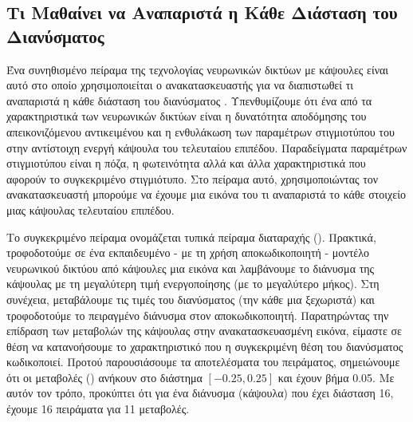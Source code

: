 \subsection{Τι Μαθαίνει να Αναπαριστά η Κάθε Διάσταση του Διανύσματος }
Ένα συνηθισμένο πείραμα της τεχνολογίας νευρωνικών δικτύων με κάψουλες είναι αυτό στο οποίο χρησιμοποιείται ο ανακατασκευαστής για να διαπιστωθεί τι αναπαριστά η κάθε διάσταση του διανύσματος . Υπενθυμίζουμε ότι ένα από τα χαρακτηριστικά των νευρωνικών δικτύων είναι η δυνατότητα αποδόμησης του απεικονιζόμενου αντικειμένου και η ενθυλάκωση των παραμέτρων στιγμιοτύπου του στην αντίστοιχη ενεργή κάψουλα του τελευταίου επιπέδου. Παραδείγματα παραμέτρων στιγμιοτύπου είναι η πόζα, η φωτεινότητα αλλά και άλλα χαρακτηριστικά που αφορούν το συγκεκριμένο στιγμιότυπο. Στο πείραμα αυτό, χρησιμοποιώντας τον ανακατασκευαστή μπορούμε να έχουμε μια εικόνα του τι αναπαριστά το κάθε στοιχείο μιας κάψουλας τελευταίου επιπέδου.\par

Το συγκεκριμένο πείραμα ονομάζεται τυπικά πείραμα διαταραχής (). Πρακτικά, τροφοδοτούμε σε ένα εκπαιδευμένο - με τη χρήση αποκωδικοποιητή - μοντέλο νευρωνικού δικτύου από κάψουλες μια εικόνα και λαμβάνουμε το διάνυσμα της κάψουλας  με τη μεγαλύτερη τιμή ενεργοποίησης (με το μεγαλύτερο μήκος). Στη συνέχεια, μεταβάλουμε τις τιμές του διανύσματος (την κάθε μια ξεχωριστά) και τροφοδοτούμε το πειραγμένο διάνυσμα στον αποκωδικοποιητή. Παρατηρώντας την επίδραση των μεταβολών της κάψουλας στην ανακατασκευασμένη εικόνα, είμαστε σε θέση να  κατανοήσουμε το χαρακτηριστικό που η συγκεκριμένη θέση του διανύσματος  κωδικοποιεί. Προτού παρουσιάσουμε τα αποτελέσματα του πειράματος, σημειώνουμε ότι οι μεταβολές () ανήκουν στο διάστημα $[-0.25, 0.25]$ και έχουν βήμα 0.05. Με αυτόν τον τρόπο, προκύπτει ότι για ένα διάνυσμα (κάψουλα) που έχει διάσταση 16, έχουμε 16 πειράματα για 11 μεταβολές.\par

